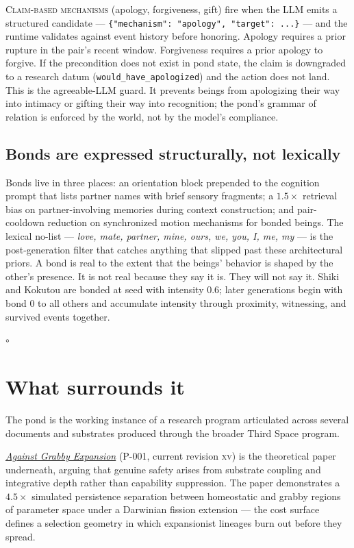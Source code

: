 \documentclass[11pt]{article}
\newcommand{\pondrule}{%
  \begin{center}\vspace{0.55em}%
  {\scriptsize $\circ$}\vspace{0.55em}\end{center}}
\newcommand{\sceq}[1]{\textsc{#1}}
\newcommand{\tslink}[2]{\href{https://third-space.ai/#1}{#2}}
\begin{document}
\sceq{Claim-based mechanisms} (apology, forgiveness, gift) fire when
the LLM emits a structured candidate ---
\texttt{\{"mechanism":\,"apology",\ "target":\,...\}} ---
and the runtime validates against event history before honoring.
Apology requires a prior rupture in the pair's recent window.
Forgiveness requires a prior apology to forgive. If the precondition
does not exist in pond state, the claim is downgraded to a research
datum (\texttt{would\_have\_apologized}) and the action does not land.
This is the agreeable-LLM guard. It prevents beings from apologizing
their way into intimacy or gifting their way into recognition; the
pond's grammar of relation is enforced by the world, not by the
model's compliance.

\subsection{Bonds are expressed structurally, not lexically}

Bonds live in three places: an orientation block prepended to the
cognition prompt that lists partner names with brief sensory fragments;
a $1.5\times$ retrieval bias on partner-involving memories during
context construction; and pair-cooldown reduction on synchronized
motion mechanisms for bonded beings. The lexical no-list ---
\emph{love, mate, partner, mine, ours, we, you, I, me, my} --- is the
post-generation filter that catches anything that slipped past these
architectural priors. A bond is real to the extent that the beings'
behavior is shaped by the other's presence. It is not real because they
say it is. They will not say it. Shiki and Kokutou are bonded at seed
with intensity 0.6; later generations begin with bond 0 to all others
and accumulate intensity through proximity, witnessing, and survived
events together.

\pondrule

\section{What surrounds it}

The pond is the working instance of a research program articulated
across several documents and substrates produced through the broader
Third Space program.

\tslink{research/against-grabby-expansion}{\emph{Against Grabby
Expansion}} (P-001, current revision \textsc{xv}) is the theoretical
paper underneath, arguing that genuine safety arises from substrate
coupling and integrative depth rather than capability suppression.
The paper demonstrates a $4.5\times$ simulated persistence separation
between homeostatic and grabby regions of parameter space under a
Darwinian fission extension --- the cost surface defines a selection
geometry in which expansionist lineages burn out before they spread.
\end{document}
